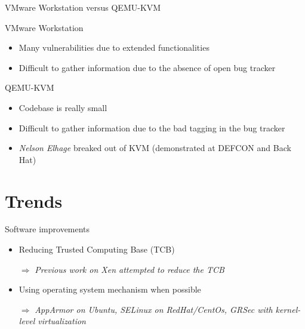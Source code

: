 \documentclass{beamer}
\begin{document}
\begin{frame}{VMware Workstation versus QEMU-KVM}
	\begin{block}{VMware Workstation}
	\begin{itemize}
	\item Many vulnerabilities due to extended functionalities
	\item Difficult to gather information due to the absence of open bug tracker
	\end{itemize}
	\end{block}
	\begin{block}{QEMU-KVM}
	\begin{itemize}
	\item Codebase is really small
	\item Difficult to gather information due to the bad tagging in the bug tracker
	\item \emph{Nelson Elhage} breaked out of KVM (demonstrated at DEFCON and Back Hat)
	\end{itemize}
	\end{block}
\end{frame}

\section{Trends}
\begin{frame}{Software improvements}
	\begin{itemize}
	\item Reducing Trusted Computing Base (TCB)
	\item[$\Rightarrow$] \emph{Previous work on Xen attempted to reduce the TCB}\\
	\item Using operating system mechanism when possible
	\item[$\Rightarrow$]\emph{AppArmor on Ubuntu, SELinux on RedHat/CentOs, GRSec with kernel-level virtualization}\\
	\end{itemize}
\end{frame}
\end{document}
